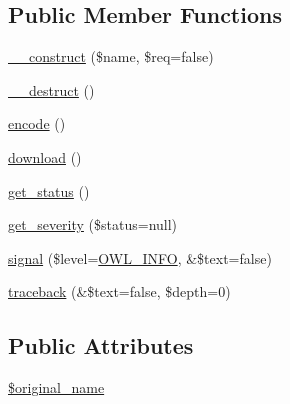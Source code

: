 \subsection*{Public Member Functions}
\begin{DoxyCompactItemize}
\item 
\hyperlink{classFileHandler_a8d75c8ea0c532acdeae0a0a4efa3704a}{\_\-\_\-construct} (\$name, \$req=false)
\item 
\hyperlink{classFileHandler_a734859e8962992da99dd8f853da5ae43}{\_\-\_\-destruct} ()
\item 
\hyperlink{classFileHandler_aa29360bf94fd54d906256561f33d93ad}{encode} ()
\item 
\hyperlink{classFileHandler_ac17edc9b92643c32ae6040b1235c64dd}{download} ()
\item 
\hyperlink{class__OWL_a99ec771fa2c5c279f80152cc09e489a8}{get\_\-status} ()
\item 
\hyperlink{class__OWL_adf9509ef96858be7bdd9414c5ef129aa}{get\_\-severity} (\$status=null)
\item 
\hyperlink{class__OWL_a51ba4a16409acf2a2f61f286939091a5}{signal} (\$level=\hyperlink{owl_8severitycodes_8php_a139328861128689f2f4def6a399d9057}{OWL\_\-INFO}, \&\$text=false)
\item 
\hyperlink{class__OWL_aa29547995d6741b7d2b90c1d4ea99a13}{traceback} (\&\$text=false, \$depth=0)
\end{DoxyCompactItemize}
\subsection*{Public Attributes}
\begin{DoxyCompactItemize}
\item 
\hyperlink{classFileHandler_a477708585850c3c8725ccf56bfe0b4a8}{\$original\_\-name}
\end{DoxyCompactItemize}

